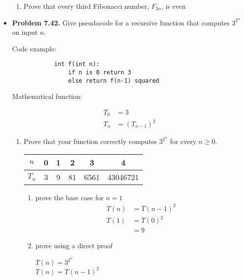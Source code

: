 \documentclass{article}
\begin{document}
\begin{itemize}
\begin{enumerate}[label=(d)]
            \item Prove that every third Fibonacci number, $F_{3n}$, is even
        \end{enumerate}
        \item \textbf{Problem 7.42.} Give pseudocode for a recursive function that computes $3^{2^n}$ on input $n$.
        \begin{center}
            Code example:
        \end{center}
        \begin{verbatim}
            int f(int n):
                if n is 0 return 3
                else return f(n-1) squared
        \end{verbatim}
        \begin{center}
            Mathematical function:
        \end{center}
        \begin{align*}
            T_0 &= 3\\
            T_n &= (T_{n-1})^2
        \end{align*}
        \begin{enumerate}[label=(\alph*)]
            \item Prove that your function correctly computes $3^{2^n}$ for every $n \geq 0$.\\
            \begin{tabular}{ c|c|c|c|c|c }
                $n$ & 0 & 1 & 2 & 3 & 4\\
                \hline
                $T_n$ & 3 & 9 & 81 & 6561 & 43046721\\
            \end{tabular}
            \begin{enumerate}[label=(\roman*)]
                \item prove the base case for $n = 1$
                \begin{align*}
                    T(n) &= T(n-1)^2\\
                    T(1) &= T(0)^2\\
                         &= 9
                \end{align*}
                \item prove using a direct proof
                \begin{center}
                    $T(n) = 3^{2^n}$\\$T(n) = T(n-1)^2$
                \end{center}
                \begin{align*}

\end{align*}
\end{enumerate}
\end{enumerate}
\end{itemize}
\end{document}
